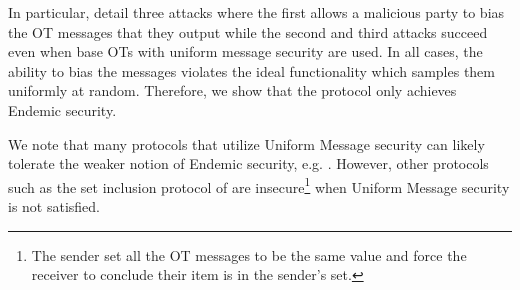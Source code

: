 \iffullversion
In particular,  detail three attacks where the first  allows a malicious party to bias the OT messages that they output while the second and third attacks succeed even when base OTs with uniform message security are used. In all cases, the ability to bias the messages violates the ideal functionality which samples them uniformly at random. Therefore, we show that the protocol only achieves Endemic security.

We note that many protocols that utilize Uniform Message security can likely tolerate the weaker notion of Endemic security, e.g. \cite{EC:RinRos17,CCS:RinRos17}.  However, other protocols such as the set inclusion protocol of \cite[Figure 5]{RSA:OrrOrsSch17} are insecure\footnote{The sender set all the OT messages to be the same value and force the receiver to conclude their item is in the sender's set.} when Uniform Message security is not satisfied. 
\fi

